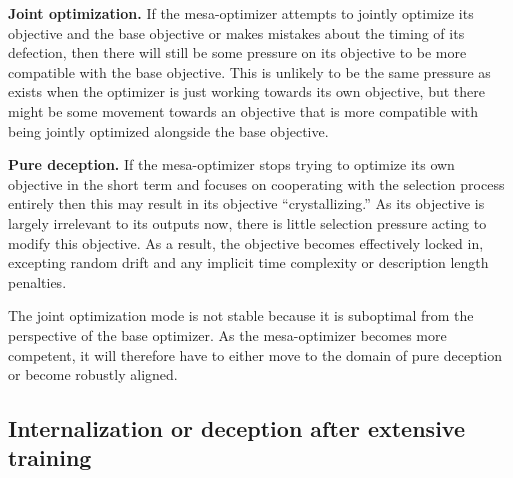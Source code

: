\documentclass[
  onecolumn,
  natbib,
]{miri-tech-article}
\begin{document}
\textbf{Joint optimization.} If the mesa-optimizer attempts to jointly optimize its objective and the base objective or makes mistakes about the timing of its defection, then there will still be some pressure on its objective to be more compatible with the base objective. This is unlikely to be the same pressure as exists when the optimizer is just working towards its own objective, but there might be some movement towards an objective that is more compatible with being jointly optimized alongside the base objective.

\textbf{Pure deception.} If the mesa-optimizer stops trying to optimize its own objective in the short term and focuses on cooperating with the selection process entirely then this may result in its objective ``crystallizing.'' As its objective is largely irrelevant to its outputs now, there is little selection pressure acting to modify this objective. As a result, the objective becomes effectively locked in, excepting random drift and any implicit time complexity or description length penalties.

The joint optimization mode is not stable because it is suboptimal from the perspective of the base optimizer. As the mesa-optimizer becomes more competent, it will therefore have to either move to the domain of pure deception or become robustly aligned.

\subsection{Internalization or deception after extensive training}
\label{sec:4.4}
\end{document}
